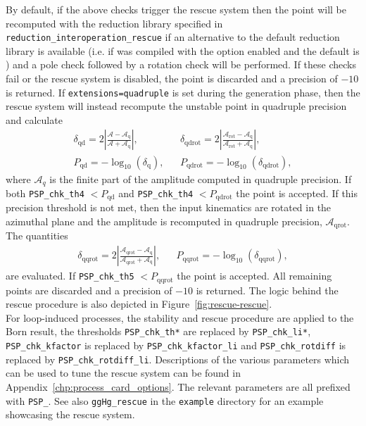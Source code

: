 By default, if the above checks trigger the rescue system then the point will be recomputed with the reduction library specified in \texttt{reduction\_interoperation\_rescue} if an alternative to the default reduction library is available (i.e. if \gosam was compiled with the \golem option enabled and the default is \ninja)  and a pole check followed by a rotation check will be performed. If these checks fail or the rescue system is disabled, the point is discarded and a precision of $-10$ is returned. If \texttt{extensions=quadruple} is set during the \gosam generation phase, then the rescue system will instead recompute the unstable point in quadruple precision and calculate
\begin{align}
&\delta_\mathrm{qd} = 2 \left| \frac{\mathcal{A}-\mathcal{A}_\mathrm{q}}{\mathcal{A}+\mathcal{A}_\mathrm{q}} \right|,&
&\delta_\mathrm{qdrot} = 2 \left| \frac{\mathcal{A}_\mathrm{rot}-\mathcal{A}_\mathrm{q}}{\mathcal{A}_\mathrm{rot}+\mathcal{A}_\mathrm{q}} \right|, & \\[10pt]
&P_\mathrm{qd} = -\log_\mathrm{10}(\delta_\mathrm{q}),&
&P_\mathrm{qdrot} = -\log_\mathrm{10}(\delta_\mathrm{qdrot}),&
\end{align}
where $\mathcal{A}_q$ is the finite part of the amplitude computed in quadruple precision. If both \texttt{PSP\_chk\_th4} $< P_\mathrm{qd}$ and \texttt{PSP\_chk\_th4} $< P_\mathrm{qdrot}$ the point is accepted. If this precision threshold is not met, then the input kinematics are rotated in the azimuthal plane and the amplitude is recomputed in quadruple precision, $\mathcal{A}_\mathrm{qrot}$. The quantities
\begin{align}
&\delta_\mathrm{qqrot} = 2 \left| \frac{\mathcal{A}_\mathrm{qrot}-\mathcal{A}_\mathrm{q}}{\mathcal{A}_\mathrm{qrot}+\mathcal{A}_\mathrm{q}} \right|,&
&P_\mathrm{qqrot} = -\log_\mathrm{10}(\delta_\mathrm{qqrot}),&
\end{align}
are evaluated. If \texttt{PSP\_chk\_th5} $< P_\mathrm{qqrot}$ the point is accepted. All remaining points are discarded and a precision of $-10$ is returned. The logic behind the rescue procedure is also depicted in Figure~\ref{fig:rescue-rescue}.\\

For loop-induced processes, the stability and rescue procedure are applied to the Born result, the thresholds \texttt{PSP\_chk\_th*} are replaced by \texttt{PSP\_chk\_li*}, \texttt{PSP\_chk\_kfactor} is replaced by \texttt{PSP\_chk\_kfactor\_li} and  \texttt{PSP\_chk\_rotdiff} is replaced by \texttt{PSP\_chk\_rotdiff\_li}. Descriptions of the various parameters which can be used to tune the rescue system can be found in Appendix~\ref{chp:process_card_options}. The relevant parameters are all prefixed with \texttt{PSP\_}. See also \texttt{ggHg\_rescue} in the \texttt{example} directory for an example showcasing the rescue system.\\

